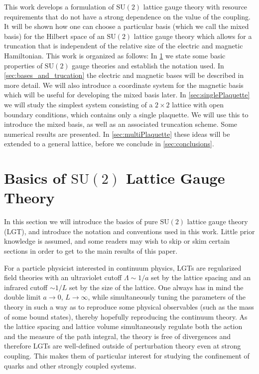 \documentclass[reprint,superscriptaddress,pra,nofootinbib,preprintnumbers,floatfix]{revtex4-1}
\providecommand{\sutwo}{$\mathrm{SU}(2)$\xspace}
\begin{document}
 

This work develops a formulation of \sutwo lattice gauge theory with resource requirements that do not have a strong dependence on the value of the coupling. 
%
It will be shown how one can choose a particular basis (which we call the mixed basis) for the Hilbert space of an \sutwo lattice gauge theory which allows for a truncation that is independent of the relative size of the electric and magnetic Hamiltonian.
%
This work is organized as follows: In \cref{sec:basics} we state some basic properties of \sutwo gauge theories and establish the notation used. 
%
In \cref{sec:bases_and_trucation} the electric and magnetic bases will be described in more detail. 
%
We will also introduce a coordinate system for the magnetic basis which will be useful for developing the mixed basis later.
%
In \cref{sec:singlePlaquette} we will study the simplest system consisting of a $2\times 2$ lattice with open boundary conditions, which contains only a single plaquette. We will use this to introduce the mixed basis, as well as an associated truncation scheme. Some numerical results are presented.
%
In \cref{sec:multiPlaquette} these ideas will be extended to a general lattice, before we conclude in \cref{sec:conclusions}. 

\section{\boldmath Basics of \texorpdfstring{\sutwo}{SU(2)} Lattice Gauge Theory} 
\label{sec:basics}
In this section we will introduce the basics of pure \sutwo lattice gauge theory (LGT), and introduce the notation and conventions used in this work.
%
Little prior knowledge is assumed, and some readers may wish to skip or skim certain sections in order to get to the main results of this paper.

For a particle physicist interested in continuum physics, LGTs are regularized field theories with an ultraviolet cutoff $\Lambda \sim 1/a$ set by the lattice spacing and an infrared cutoff $\sim 1/L$ set by the size of the lattice. 
%
One always has in mind the double limit $a \to 0$, $L \to \infty$, while simultaneously tuning the parameters of the theory in such a way as to reproduce some physical observables (such as the mass of some bound states), thereby hopefully reproducing the continuum theory. 
%
As the lattice spacing and lattice volume simultaneously regulate both the action and the measure of the path integral, the theory is free of divergences and therefore LGTs are well-defined outside of perturbation theory even at strong coupling. 
%
This makes them of particular interest for studying the confinement of quarks and other strongly coupled systems.
\end{document}
